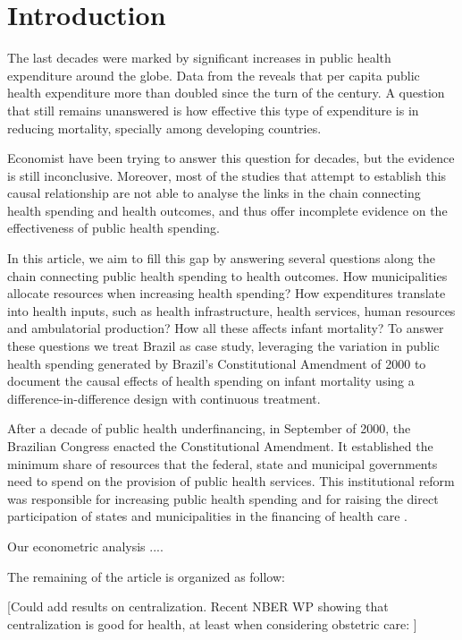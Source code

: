 \section{Introduction}\label{sec:intro}
\setcounter{page}{1}


The last decades were marked by significant increases in public health expenditure around the globe. Data from the \cite{wb} reveals that per capita public health expenditure more than doubled since the turn of the century. A question that still remains unanswered is how effective this type of expenditure is in reducing mortality, specially among developing countries. 

Economist have been trying to answer this question for decades, but the evidence is still inconclusive. Moreover, most of the studies that attempt to establish this causal relationship are not able to analyse the links in the chain connecting health spending and health outcomes, and thus offer incomplete evidence on the effectiveness of public health spending.  

In this article, we aim to fill this gap by answering several questions along the chain connecting public health spending to health outcomes. How municipalities allocate resources when increasing health spending? How expenditures translate into health inputs, such as health infrastructure, health services, human resources and ambulatorial production? How all these affects infant mortality? To answer these questions we treat Brazil as case study, leveraging the variation in public health spending generated by Brazil's  Constitutional Amendment of 2000 to document the causal effects of health spending on infant mortality using a difference-in-difference design with continuous treatment.

After a decade of public health underfinancing, in September of 2000, the Brazilian Congress enacted the  Constitutional Amendment. It established the minimum share of resources that the federal, state and municipal governments need to spend on the provision of public health services. This institutional reform was responsible for increasing public health spending and for raising the direct participation of states and municipalities in the financing of health care \citep{Piola2013}.

Our econometric analysis ....

The remaining of the article is organized as follow: 


[Could add results on centralization.  Recent NBER WP showing that centralization is good for health, at least when considering obstetric care: \citet{Fischeretal2022}]
